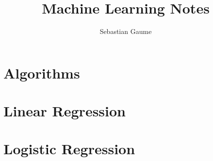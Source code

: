 \documentclass{report}
\title{Machine Learning Notes}
\author{Sebastian Gaume}
\begin{document}
\maketitle
\tableofcontents

\chapter{Algorithms}



\chapter{Linear Regression}



\chapter{Logistic Regression}


\end{document}

